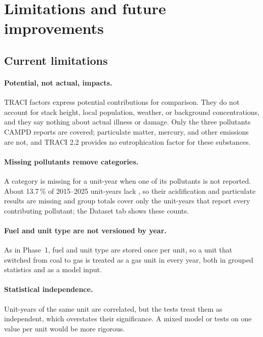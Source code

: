 \documentclass[11pt,a4paper]{article}
\begin{document}
\section{Limitations and future improvements}
\label{sec:limitations}

\subsection{Current limitations}

\paragraph{Potential, not actual, impacts.} TRACI factors express potential contributions for
comparison. They do not account for stack height, local population, weather, or background
concentrations, and they say nothing about actual illness or damage. Only the three pollutants
CAMPD reports are covered; particulate matter, mercury, and other emissions are not, and TRACI
2.2 provides no eutrophication factor for these substances.

\paragraph{Missing pollutants remove categories.} A category is missing for a unit-year when one
of its pollutants is not reported. About 13.7\,\% of 2015--2025 unit-years lack \SOtwo{}, so
their acidification and particulate results are missing and group totals cover only the
unit-years that report every contributing pollutant; the Dataset tab shows these counts.

\paragraph{Fuel and unit type are not versioned by year.} As in Phase~1, fuel and unit type are
stored once per unit, so a unit that switched from coal to gas is treated as a gas unit in every
year, both in grouped statistics and as a model input.

\paragraph{Statistical independence.} Unit-years of the same unit are correlated, but the tests
treat them as independent, which overstates their significance. A mixed model or tests on
one value per unit would be more rigorous.
\end{document}
